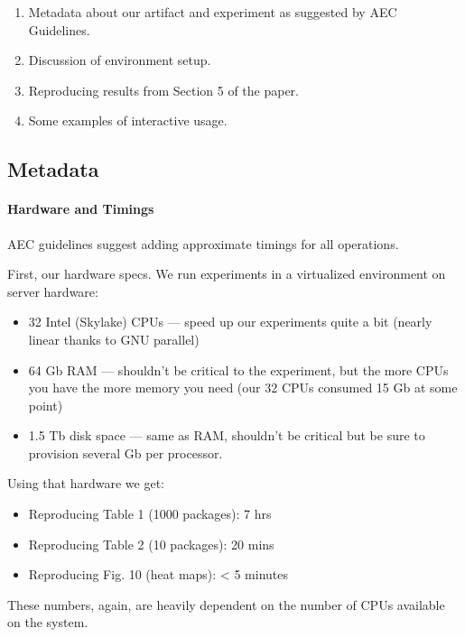 \documentclass[
]{article}
\providecommand{\tightlist}{%
  \setlength{\itemsep}{0pt}\setlength{\parskip}{0pt}}
\begin{document}
\begin{enumerate}
\def\labelenumi{\arabic{enumi}.}
\item
  Metadata about our artifact and experiment as suggested by AEC
  Guidelines.
\item
  Discussion of environment setup.
\item
  Reproducing results from Section 5 of the paper.
\item
  Some examples of interactive usage.
\end{enumerate}

\hypertarget{metadata}{%
\subsection{Metadata}\label{metadata}}

\hypertarget{hardware-and-timings}{%
\paragraph{Hardware and Timings}\label{hardware-and-timings}}

AEC guidelines suggest adding approximate timings for all operations.

First, our hardware specs. We run experiments in a virtualized
environment on server hardware:

\begin{itemize}
\item
  32 Intel (Skylake) CPUs --- speed up our experiments quite a bit
  (nearly linear thanks to GNU parallel)
\item
  64 Gb RAM --- shouldn't be critical to the experiment, but the more
  CPUs you have the more memory you need (our 32 CPUs consumed 15 Gb at
  some point)
\item
  1.5 Tb disk space --- same as RAM, shouldn't be critical but be sure to
  provision several Gb per processor.
\end{itemize}

Using that hardware we get:

\begin{itemize}
\tightlist
\item
  Reproducing Table 1 (1000 packages): 7 hrs
\item
  Reproducing Table 2 (10 packages): 20 mins
\item
  Reproducing Fig. 10 (heat maps): \textless{} 5 minutes
\end{itemize}

These numbers, again, are heavily dependent on the number of CPUs
available on the system.
\end{document}
